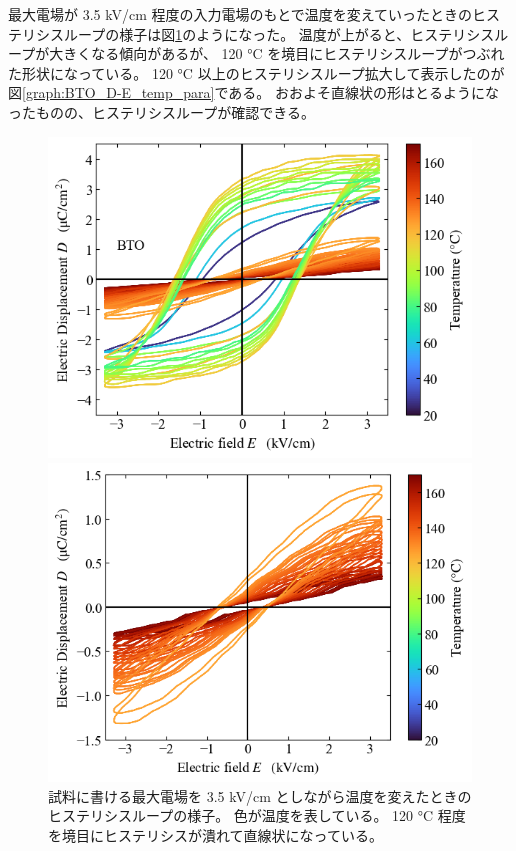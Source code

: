 \documentclass[11pt,dvipdfmx,a4paper]{jsarticle}
\begin{document}
最大電場が 3.5 kV/cm 程度の入力電場のもとで温度を変えていったときのヒステリシスループの様子は図\ref{graph:BTO_D-E_temp}のようになった。
温度が上がると、ヒステリシスループが大きくなる傾向があるが、
120 \si{\degreeCelsius} を境目にヒステリシスループがつぶれた形状になっている。
120 \si{\degreeCelsius} 以上のヒステリシスループ拡大して表示したのが図\ref{graph:BTO_D-E_temp_para}である。
おおよそ直線状の形はとるようになったものの、ヒステリシスループが確認できる。
\begin{figure}[H]
    \begin{minipage}[t]{0.48\columnwidth}
        \centering
        \includegraphics[width=\columnwidth]{BTO_D-E.png}
        \caption{\small{試料に書ける最大電場を 3.5 kV/cm としながら温度を変えたときのヒステリシスループの様子。
        色が温度を表している。
        120 \si{\degreeCelsius} 程度を境目にヒステリシスが潰れて直線状になっている。}}
        \label{graph:BTO_D-E_temp}
    \end{minipage}
    \hfill
    \begin{minipage}[t]{0.48\columnwidth}
        \centering
        \includegraphics[width=\columnwidth]{BTO_D-E_para.png}

\end{minipage}
\end{figure}
\end{document}

